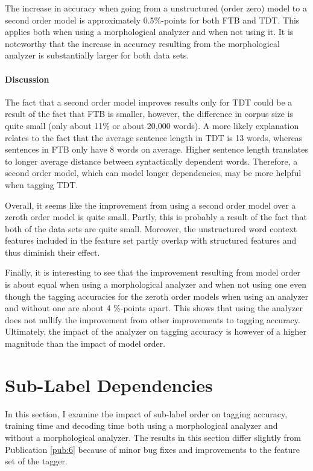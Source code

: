 The increase in accuracy when going from a unstructured (order zero)
model to a second order model is approximately 0.5\%-points for both
FTB and TDT. This applies both when using a morphological analyzer and
when not using it. It is noteworthy that the increase in accuracy
resulting from the morphological analyzer is substantially larger for
both data sets.

\paragraph{Discussion} The fact that a second order model improves
results only for TDT could be a result of the fact that FTB is
smaller, however, the difference in corpus size is quite small (only about
11\% or about 20,000 words). A more likely explanation relates to the
fact that the average sentence length in TDT is 13 words, whereas
sentences in FTB only have 8 words on average. Higher sentence length
translates to longer average distance between syntactically
dependent words. Therefore, a second order model, which can model longer
dependencies, may be more helpful when tagging TDT.

Overall, it seems like the improvement from using a second order model
over a zeroth order model is quite small. Partly, this is probably a
result of the fact that both of the data sets are quite
small. Moreover, the unstructured word context features included in
the feature set partly overlap with structured features and thus
diminish their effect.

Finally, it is interesting to see that the improvement resulting from
model order is about equal when using a morphological analyzer and
when not using one even though the tagging accuracies for the zeroth
order models when using an analyzer and without one are about 4
\%-points apart. This shows that using the analyzer does not nullify
the improvement from other improvements to tagging accuracy. Ultimately,
the impact of the analyzer on tagging accuracy is however of a
higher magnitude than the impact of model order.
 
\section{Sub-Label Dependencies}

In this section, I examine the impact of sub-label order on
tagging accuracy, training time and decoding time both using a
morphological analyzer and without a morphological analyzer. The
results in this section differ slightly from Publication \ref{pub:6}
because of minor bug fixes and improvements to the feature set of the
tagger.

